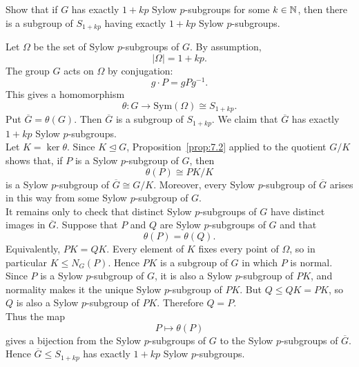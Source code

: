 \documentclass[../Odyssey_Project.tex]{subfiles}
\begin{document}
\begin{exercise}
\label{ex:7.7}
Show that if $G$ has exactly $1 + kp$ Sylow $p$-subgroups for some $k \in \mathbb{N}$, then there is a subgroup of $S_{1+kp}$ having exactly $1 + kp$ Sylow $p$-subgroups.
\end{exercise}
\begin{solution}
Let $\Omega$ be the set of Sylow $p$-subgroups of $G$. By assumption,
\[
    |\Omega|=1+kp.
\]
The group $G$ acts on $\Omega$ by conjugation:
\[
    g\cdot P=gPg^{-1}.
\]
This gives a homomorphism
\[
    \theta\colon G\to \mathrm{Sym}(\Omega)\cong S_{1+kp}.
\]
Put $\overline{G}=\theta(G)$. Then $\overline{G}$ is a subgroup of $S_{1+kp}$. We claim that $\overline{G}$ has exactly $1+kp$ Sylow $p$-subgroups.\\
Let $K=\ker\theta$. Since $K\trianglelefteq G$, Proposition~\ref{prop:7.2} applied to the quotient $G/K$ shows that, if $P$ is a Sylow $p$-subgroup of $G$, then
\[
    \theta(P)\cong PK/K
\]
is a Sylow $p$-subgroup of $\overline{G}\cong G/K$. Moreover, every Sylow $p$-subgroup of $\overline{G}$ arises in this way from some Sylow $p$-subgroup of $G$.\\
It remains only to check that distinct Sylow $p$-subgroups of $G$ have distinct images in $\overline{G}$. Suppose that $P$ and $Q$ are Sylow $p$-subgroups of $G$ and that
\[
    \theta(P)=\theta(Q).
\]
Equivalently, $PK=QK$. Every element of $K$ fixes every point of $\Omega$, so in particular $K\leq N_G(P)$. Hence $PK$ is a subgroup of $G$ in which $P$ is normal. Since $P$ is a Sylow $p$-subgroup of $G$, it is also a Sylow $p$-subgroup of $PK$, and normality makes it the unique Sylow $p$-subgroup of $PK$. But $Q\leq QK=PK$, so $Q$ is also a Sylow $p$-subgroup of $PK$. Therefore $Q=P$.\\
Thus the map
\[
    P\mapsto \theta(P)
\]
gives a bijection from the Sylow $p$-subgroups of $G$ to the Sylow $p$-subgroups of $\overline{G}$. Hence $\overline{G}\leq S_{1+kp}$ has exactly $1+kp$ Sylow $p$-subgroups.
\end{solution}
\end{document}
